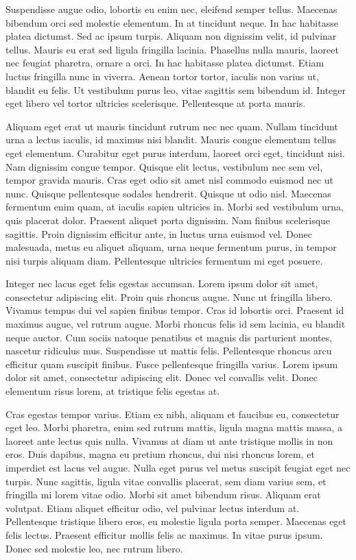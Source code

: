 Suspendisse augue odio, lobortis eu enim nec, eleifend semper tellus. Maecenas bibendum orci sed molestie elementum. In at tincidunt neque. In hac habitasse platea dictumst. Sed ac ipsum turpis. Aliquam non dignissim velit, id pulvinar tellus. Mauris eu erat sed ligula fringilla lacinia. Phasellus nulla mauris, laoreet nec feugiat pharetra, ornare a orci. In hac habitasse platea dictumst. Etiam luctus fringilla nunc in viverra. Aenean tortor tortor, iaculis non varius ut, blandit eu felis. Ut vestibulum purus leo, vitae sagittis sem bibendum id. Integer eget libero vel tortor ultricies scelerisque. Pellentesque at porta mauris.

Aliquam eget erat ut mauris tincidunt rutrum nec nec quam. Nullam tincidunt urna a lectus iaculis, id maximus nisi blandit. Mauris congue elementum tellus eget elementum. Curabitur eget purus interdum, laoreet orci eget, tincidunt nisi. Nam dignissim congue tempor. Quisque elit lectus, vestibulum nec sem vel, tempor gravida mauris. Cras eget odio sit amet nisl commodo euismod nec ut nunc. Quisque pellentesque sodales hendrerit. Quisque ut odio nisl. Maecenas fermentum enim quam, at iaculis sapien ultricies in. Morbi sed vestibulum urna, quis placerat dolor. Praesent aliquet porta dignissim. Nam finibus scelerisque sagittis. Proin dignissim efficitur ante, in luctus urna euismod vel. Donec malesuada, metus eu aliquet aliquam, urna neque fermentum purus, in tempor nisi turpis aliquam diam. Pellentesque ultricies fermentum mi eget posuere.

Integer nec lacus eget felis egestas accumsan. Lorem ipsum dolor sit amet, consectetur adipiscing elit. Proin quis rhoncus augue. Nunc ut fringilla libero. Vivamus tempus dui vel sapien finibus tempor. Cras id lobortis orci. Praesent id maximus augue, vel rutrum augue. Morbi rhoncus felis id sem lacinia, eu blandit neque auctor. Cum sociis natoque penatibus et magnis dis parturient montes, nascetur ridiculus mus. Suspendisse ut mattis felis. Pellentesque rhoncus arcu efficitur quam suscipit finibus. Fusce pellentesque fringilla varius. Lorem ipsum dolor sit amet, consectetur adipiscing elit. Donec vel convallis velit. Donec elementum risus lorem, at tristique felis egestas at.

Cras egestas tempor varius. Etiam ex nibh, aliquam et faucibus eu, consectetur eget leo. Morbi pharetra, enim sed rutrum mattis, ligula magna mattis massa, a laoreet ante lectus quis nulla. Vivamus at diam ut ante tristique mollis in non eros. Duis dapibus, magna eu pretium rhoncus, dui nisi rhoncus lorem, et imperdiet est lacus vel augue. Nulla eget purus vel metus suscipit feugiat eget nec turpis. Nunc sagittis, ligula vitae convallis placerat, sem diam varius sem, et fringilla mi lorem vitae odio. Morbi sit amet bibendum risus. Aliquam erat volutpat. Etiam aliquet efficitur odio, vel pulvinar lectus interdum at. Pellentesque tristique libero eros, eu molestie ligula porta semper. Maecenas eget felis lectus. Praesent efficitur mollis felis ac maximus. In vitae purus ipsum. Donec sed molestie leo, nec rutrum libero.

